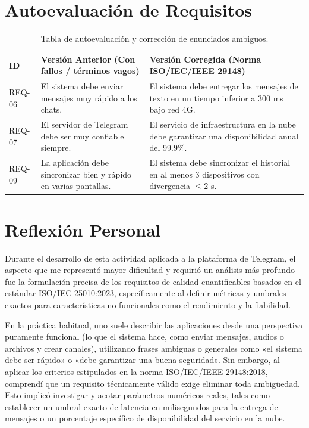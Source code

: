 \documentclass[11pt,a4paper]{article}
\begin{document}
\section{Autoevaluación de Requisitos}
\begin{table}[h]
\centering
\small
\begin{tabularx}{\textwidth}{l X X}
\toprule
\textbf{ID} & \textbf{Versión Anterior (Con fallos / términos vagos)} & \textbf{Versión Corregida (Norma ISO/IEC/IEEE 29148)} \\
\midrule
REQ-06 & El sistema debe enviar mensajes muy rápido a los chats. & El sistema debe entregar los mensajes de texto en un tiempo inferior a 300 ms bajo red 4G. \\
REQ-07 & El servidor de Telegram debe ser muy confiable siempre. & El servicio de infraestructura en la nube debe garantizar una disponibilidad anual del 99.9\%. \\
REQ-09 & La aplicación debe sincronizar bien y rápido en varias pantallas. & El sistema debe sincronizar el historial en al menos 3 dispositivos con divergencia $\le 2$ s. \\
\bottomrule
\end{tabularx}%
\caption{Tabla de autoevaluación y corrección de enunciados ambiguos.}
\label{tab:autoeval}
\end{table}

\section{Reflexión Personal}
Durante el desarrollo de esta actividad aplicada a la plataforma de Telegram, el aspecto que me representó mayor dificultad y requirió un análisis más profundo fue la formulación precisa de los requisitos de calidad cuantificables basados en el estándar ISO/IEC 25010:2023, específicamente al definir métricas y umbrales exactos para características no funcionales como el rendimiento y la fiabilidad. 

En la práctica habitual, uno suele describir las aplicaciones desde una perspectiva puramente funcional (lo que el sistema hace, como enviar mensajes, audios o archivos y crear canales), utilizando frases ambiguas o generales como «el sistema debe ser rápido» o «debe garantizar una buena seguridad». Sin embargo, al aplicar los criterios estipulados en la norma ISO/IEC/IEEE 29148:2018, comprendí que un requisito técnicamente válido exige eliminar toda ambigüedad. Esto implicó investigar y acotar parámetros numéricos reales, tales como establecer un umbral exacto de latencia en milisegundos para la entrega de mensajes o un porcentaje específico de disponibilidad del servicio en la nube. 
\end{document}
